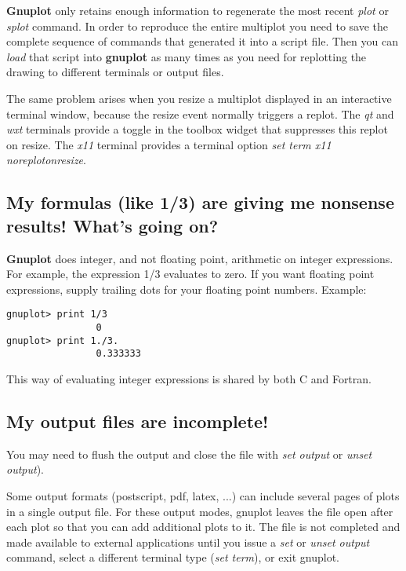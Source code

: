 \documentclass[letter,11pt]{article}
\newcommand{\gnuplot}{\textbf{gnuplot }}
\newcommand{\Gnuplot}{\textbf{Gnuplot }}
\begin{document}
{\Gnuplot only retains enough information to regenerate the most recent
{\em plot} or {\em splot} command.
In order to reproduce the entire multiplot you need to save the complete
sequence of commands that generated it into a script file.
Then you can {\em load} that script into \gnuplot as many times as you need
for replotting the drawing to different terminals or output files.

The same problem arises when you resize a multiplot displayed in an interactive
terminal window, because the resize event normally triggers a replot.
The {\em qt} and {\em wxt} terminals provide a toggle in the toolbox widget
that suppresses this replot on resize.  The {\em x11} terminal provides a 
terminal option {\em set term x11 noreplotonresize}.

\subsection{My formulas (like 1/3) are giving me nonsense results! What's going on?}

\Gnuplot{} does integer, and not floating point, arithmetic on
integer expressions. For example, the expression 1/3 evaluates
to zero. If you want floating point expressions, supply
trailing dots for your floating point numbers. Example:


\small
\begin{verbatim}
gnuplot> print 1/3
                0
gnuplot> print 1./3.
                0.333333
\end{verbatim}
\normalsize

This way of evaluating integer expressions is shared by both C and Fortran.


\subsection{My output files are incomplete!}

You may need to flush the output and close the file with
{\em set output} or {\em unset output}).

Some output formats (postscript, pdf, latex, ...) can include several
pages of plots in a single output file.  For these output modes, gnuplot
leaves the file open after each plot so that you can add additional plots
to it.  The file is not completed and made available to external applications
until you issue a {\em set} or {\em unset output} command,
select a different terminal type ({\em set term}), or exit gnuplot.


}
\end{document}
